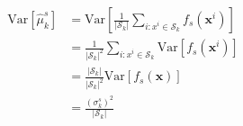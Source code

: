 \documentclass[runningheads, envcountsame, a4paper]{llncs}
\newcommand{\xb}{\mathbf{x}}
\begin{document}
\begin{equation}
  \begin{split}
  \mathrm{Var}[\hat{\mu}_k^s] &= \mathrm{Var} [\frac{1}{|\mathcal{S}_k|} \sum_{i: x^i\in \mathcal{S}_k} f_s(\xb^i)] \\
                              &= \frac{1}{|\mathcal{S}_k|^2} \sum_{i: x^i\in \mathcal{S}_k} \mathrm{Var}[f_s(\xb^i)] \\
                              &= \frac{|\mathcal{S}_k|}{|\mathcal{S}_k|^2} \mathrm{Var}[f_s(\xb)] \\
  &= \frac{(\sigma_k^s)^2}{|\mathcal{S}_k|}  \\
  \end{split}
\end{equation}





\end{document}
